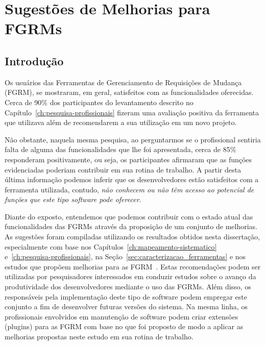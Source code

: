 \chapter{Sugestões de Melhorias para FGRMs}
\label{ch:sug_melhoria}

\section{Introdução}
\label{sec:sug_melhoria_intro}

Os usuários das Ferramentas de Gerenciamento de Requisições de Mudança (FGRM),
se mostraram, em geral, satisfeitos com as funcionalidades oferecidas. Cerca de
90\% dos par\-ti\-ci\-pan\-tes do levantamento descrito no
Capítulo~\ref{ch:pesquisa-profissionais} fizeram uma avaliação positiva da
ferramenta que utilizava além de recomendarem a sua utilização em um novo
projeto.

Não obstante, naquela mesma pesquisa, ao perguntarmos se o profissional sentiria
falta de alguma das funcionalidades que lhe foi apresentada, cerca de 85\%
responderam positivamente, ou seja, os participantes afirmaram que as funções
evidenciadas poderiam contribuir em sua rotina de trabalho. A partir desta
última informação podemos inferir que os desenvolvedores estão satisfeitos com a
ferramenta utilizada, contudo, \textit{não conhecem ou não têm acesso ao
    potencial de funções que este tipo software pode oferecer}.

Diante do exposto, entendemos que podemos contribuir com o estado a\-tu\-al das
funcionalidades das FGRMs através da proposição de um conjunto de melhorias. As
sugestões foram compiladas utilizando os resultados obtidos nesta dissertação,
especialmente com base nos Capítulos~\ref{ch:mapeamento-sistematico}
e~\ref{ch:pesquisa-profissionais}, na Seção~\ref{sec:caracterizacao_ferramentas}
e nos estudos que propõem melhorias para as FGRM~\cite{zimmermann2009improving,
    bettenburg2008makes, singh2011bug}. Estas recomendações podem ser utilizadas
por pesquisadores interessados em conduzir estudos sobre o avanço da
produtividade dos desenvolvedores mediante o uso das FGRMs. Além disso, os
responsáveis pela implementação deste tipo de software podem empregar este
conjunto a fim de desenvolver futuras versões do sistema. Na mesma linha, os
profissionais envolvidos em manutenção de software podem criar extensões
(plugins) para as FGRM com base no que foi proposto de modo a aplicar as
melhorias propostas neste estudo em sua rotina de trabalho.


